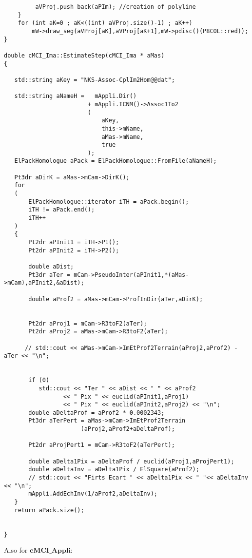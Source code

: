 \begin{verbatim}
         aVProj.push_back(aPIm); //creation of polyline
    }
    for (int aK=0 ; aK<((int) aVProj.size()-1) ; aK++)
        mW->draw_seg(aVProj[aK],aVProj[aK+1],mW->pdisc()(P8COL::red));
}

double cMCI_Ima::EstimateStep(cMCI_Ima * aMas)
{

   std::string aKey = "NKS-Assoc-CplIm2Hom@@dat";

   std::string aNameH =   mAppli.Dir()
                        + mAppli.ICNM()->Assoc1To2
                        (
                            aKey,
                            this->mName,
                            aMas->mName,
                            true
                        );
   ElPackHomologue aPack = ElPackHomologue::FromFile(aNameH);

   Pt3dr aDirK = aMas->mCam->DirK();
   for
   (
       ElPackHomologue::iterator iTH = aPack.begin();
       iTH != aPack.end();
       iTH++
   )
   {
       Pt2dr aPInit1 = iTH->P1();
       Pt2dr aPInit2 = iTH->P2();

       double aDist;
       Pt3dr aTer = mCam->PseudoInter(aPInit1,*(aMas->mCam),aPInit2,&aDist);

       double aProf2 = aMas->mCam->ProfInDir(aTer,aDirK);


       Pt2dr aProj1 = mCam->R3toF2(aTer);
       Pt2dr aProj2 = aMas->mCam->R3toF2(aTer);

      // std::cout << aMas->mCam->ImEtProf2Terrain(aProj2,aProf2) -aTer << "\n";


       if (0)
          std::cout << "Ter " << aDist << " " << aProf2
                 << " Pix " << euclid(aPInit1,aProj1)
                 << " Pix " << euclid(aPInit2,aProj2) << "\n";
       double aDeltaProf = aProf2 * 0.0002343;
       Pt3dr aTerPert = aMas->mCam->ImEtProf2Terrain
                      (aProj2,aProf2+aDeltaProf);

       Pt2dr aProjPert1 = mCam->R3toF2(aTerPert);

       double aDelta1Pix = aDeltaProf / euclid(aProj1,aProjPert1);
       double aDeltaInv = aDelta1Pix / ElSquare(aProf2);
       // std::cout << "Firts Ecart " << aDelta1Pix << " "<< aDeltaInv  << "\n";
       mAppli.AddEchInv(1/aProf2,aDeltaInv);
   }
   return aPack.size();


}
\end{verbatim}
Also for $\textbf{cMCI\_Appli}$:

